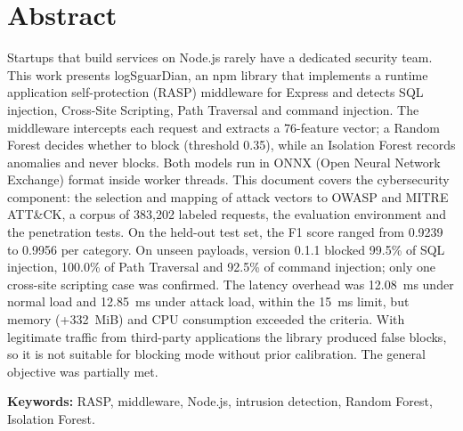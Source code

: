 \ifdefined\modoensamble
\else
	
	\chapter*{Abstract}
\fi

Startups that build services on Node.js rarely have a dedicated security team. This work presents logSguarDian, an npm library that implements a runtime application self-protection (RASP) middleware for Express and detects SQL injection, Cross-Site Scripting, Path Traversal and command injection. The middleware intercepts each request and extracts a 76-feature vector; a Random Forest decides whether to block (threshold 0.35), while an Isolation Forest records anomalies and never blocks. Both models run in ONNX (Open Neural Network Exchange) format inside worker threads. This document covers the cybersecurity component: the selection and mapping of attack vectors to OWASP and MITRE ATT\&CK, a corpus of 383,202 labeled requests, the evaluation environment and the penetration tests. On the held-out test set, the F1 score ranged from 0.9239 to 0.9956 per category. On unseen payloads, version 0.1.1 blocked 99.5\% of SQL injection, 100.0\% of Path Traversal and 92.5\% of command injection; only one cross-site scripting case was confirmed. The latency overhead was 12.08~ms under normal load and 12.85~ms under attack load, within the 15~ms limit, but memory (+332~MiB) and CPU consumption exceeded the criteria. With legitimate traffic from third-party applications the library produced false blocks, so it is not suitable for blocking mode without prior calibration. The general objective was partially met.

\medskip
\noindent\textbf{Keywords:} RASP, middleware, Node.js, intrusion detection, Random Forest, Isolation Forest.

\ifdefined\modoensamble
\else
	
\fi
